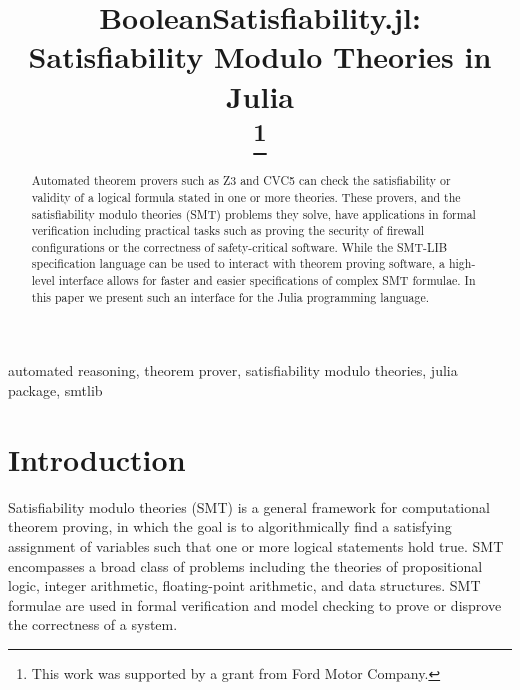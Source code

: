 \documentclass[conference]{IEEEtran}
\begin{document}
\title{BooleanSatisfiability.jl: Satisfiability Modulo Theories in Julia\\
\thanks{This work was supported by a grant from Ford Motor Company.} %
}

\author{
\and
{}
\and
{}
}

\maketitle

\begin{abstract}
Automated theorem provers such as Z3 and CVC5 can check the satisfiability or validity of a logical formula stated in one or more theories. These provers, and the satisfiability modulo theories (SMT) problems they solve, have applications in formal verification including practical tasks such as proving the security of firewall configurations or the correctness of safety-critical software. While the SMT-LIB specification language can be used to interact with theorem proving software, a high-level interface allows for faster and easier specifications of complex SMT formulae. In this paper we present such an interface for the Julia programming language.
\end{abstract}

\begin{IEEEkeywords}
automated reasoning, theorem prover, satisfiability modulo theories, julia package, smtlib
\end{IEEEkeywords}

\section{Introduction}
Satisfiability modulo theories (SMT) is a general framework for computational theorem proving, in which the goal is to algorithmically find a satisfying assignment of variables such that one or more logical statements hold true. SMT encompasses a broad class of problems including the theories of propositional logic, integer arithmetic, floating-point arithmetic, and data structures. SMT formulae are used in formal verification and model checking to prove or disprove the correctness of a system.
\end{document}
